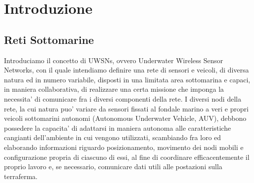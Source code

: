 \chapter{Introduzione}

\section{Reti Sottomarine}
Introduciamo il concetto di UWSNs, ovvero Underwater Wireless  Sensor Networks, con il quale intendiamo definire una rete di sensori e veicoli, di diversa natura ed in numero variabile, disposti in una limitata area sottomarina e capaci, in maniera collaborativa, di realizzare una certa missione che imponga la necessita' di comunicare fra i diversi componenti della rete.\newline
I diversi nodi della rete, la cui natura puo' variare da sensori fissati al fondale marino a veri e propri veicoli sottomarini autonomi (Autonomous Underwater Vehicle, AUV), debbono possedere la capacita' di adattarsi in maniera autonoma alle caratteristiche cangianti dell'ambiente in cui vengono utilizzati, scambiando fra loro ed elaborando informazioni riguardo posizionamento, movimento dei nodi mobili e configurazione propria di ciascuno di essi, al fine di coordinare efficacentemente il proprio lavoro e, se necessario, comunicare dati utili alle postazioni sulla terraferma.

